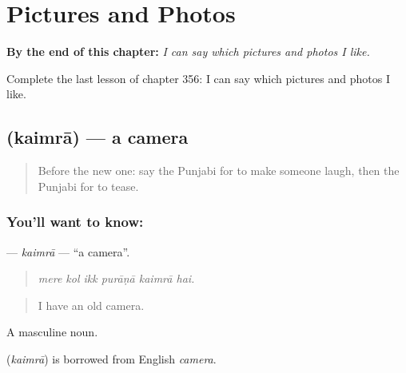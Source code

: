 
\chapter{Pictures and Photos}
\label{ch:pa-a2-pictures-and-photos}

\begin{chapteropening}
\textbf{By the end of this chapter:} \emph{I can say which pictures and photos I like.}

Complete the last lesson of chapter 356: I can say which pictures and photos I like.
\end{chapteropening}

\section[\texorpdfstring{\pa{ਕੈਮਰਾ} (kaimrā)}{ਕੈਮਰਾ (kaimrā)}]{ (kaimrā) — a camera}

\label{lesson:PA-C356-kaimra}



\begin{quote}
Before the new one: say the Punjabi for to make someone laugh, then the Punjabi for to tease.
\end{quote}

\subsection*{You'll want to know: }
\textbf{} — \emph{kaimrā} — \textquotedblleft{}a camera\textquotedblright{}.

\begin{quote}
     
\end{quote}

\begin{quote}
\emph{mere kol ikk purāṇā kaimrā hai.}
\end{quote}

\begin{quote}
I have an old camera.
\end{quote}

A masculine noun.

\begin{cousinweb}
\textbf{} (\emph{kaimrā}) is borrowed from English \emph{camera}.
\end{cousinweb}

